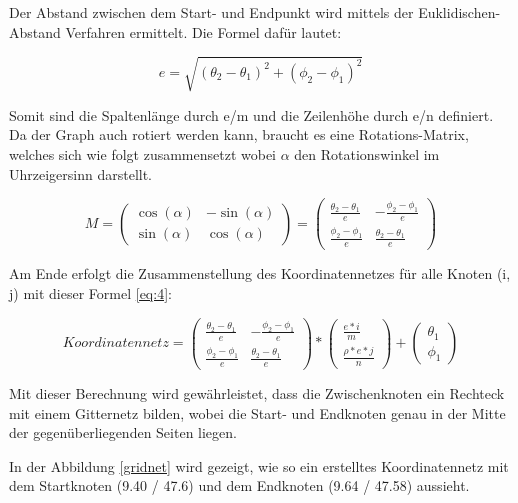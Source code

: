 Der Abstand zwischen dem Start- und Endpunkt wird mittels der
Euklidischen-Abstand Verfahren ermittelt. Die Formel dafür lautet:

\begin{equation}
\label{eq:2}
e = \sqrt{ (\theta_2 - \theta_1)^2 + (\phi_2-\phi_1)^2}
\end{equation}

Somit sind die Spaltenlänge durch e/m und die Zeilenhöhe durch e/n definiert.
Da der Graph auch rotiert werden kann, braucht es eine Rotations-Matrix,
welches sich wie folgt zusammensetzt wobei $\alpha$ den Rotationswinkel im
Uhrzeigersinn darstellt.

\begin{equation}
\label{eq:3}
 M = \begin{pmatrix} \cos(\alpha) & -\sin(\alpha) \\ \sin(\alpha) &
 \cos(\alpha) \end{pmatrix} = \begin{pmatrix} \frac{\theta_2 - \theta_1}{e} &
 -\frac{\phi_2 - \phi_1}{e} \\ \frac{\phi_2 - \phi_1}{e} & \frac{\theta_2 -
 \theta_1}{e} \end{pmatrix}
\end{equation}

Am Ende erfolgt die Zusammenstellung des Koordinatennetzes für alle Knoten (i,
j) mit dieser Formel \eqref{eq:4}:

\begin{equation}
\label{eq:4}
Koordinatennetz = \begin{pmatrix} \frac{\theta_2 - \theta_1}{e} & -\frac{\phi_2 - \phi_1}{e} \\ \frac{\phi_2 - \phi_1}{e} & \frac{\theta_2 - \theta_1}{e} \end{pmatrix} * \begin{pmatrix}  \frac{e*i}{m} \\ \frac{\rho*e*j}{n} \end{pmatrix} + \begin{pmatrix}  \theta_1 \\ \phi_1 \end{pmatrix}
\end{equation}

Mit dieser Berechnung wird gewährleistet, dass die Zwischenknoten ein Rechteck
mit einem Gitternetz bilden, wobei die Start- und Endknoten genau in der Mitte
der gegenüberliegenden Seiten liegen.

In der Abbildung \ref{gridnet} wird gezeigt, wie so ein erstelltes
Koordinatennetz mit dem Startknoten (9.40 / 47.6) und dem Endknoten (9.64 /
47.58) aussieht.

